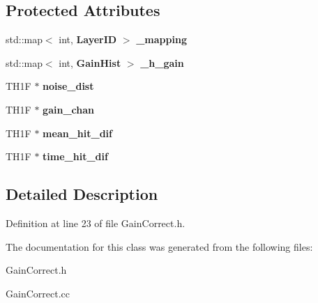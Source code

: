 \subsection*{Protected Attributes}
\begin{DoxyCompactItemize}
\item 
std\-::map$<$ int, {\bf Layer\-I\-D} $>$ {\bfseries \-\_\-mapping}\label{classGainCorrect_aff3835d1b24e6a6a7bfaa4d10158e13d}

\item 
std\-::map$<$ int, {\bf Gain\-Hist} $>$ {\bfseries \-\_\-h\-\_\-gain}\label{classGainCorrect_a67c3261e2ee9c65aa617661ef634052c}

\item 
T\-H1\-F $\ast$ {\bfseries noise\-\_\-dist}\label{classGainCorrect_a923de2eb0f07ab046e8c0205ac1ff968}

\item 
T\-H1\-F $\ast$ {\bfseries gain\-\_\-chan}\label{classGainCorrect_a38da4f5cc568c29f328cc09a1d780b7f}

\item 
T\-H1\-F $\ast$ {\bfseries mean\-\_\-hit\-\_\-dif}\label{classGainCorrect_aae8b02a5da778ef4fb29ad4b1d672d6a}

\item 
T\-H1\-F $\ast$ {\bfseries time\-\_\-hit\-\_\-dif}\label{classGainCorrect_ac468b93238fcf95b7d5d32c5a6724875}

\end{DoxyCompactItemize}


\subsection{Detailed Description}


Definition at line 23 of file Gain\-Correct.\-h.



The documentation for this class was generated from the following files\-:\begin{DoxyCompactItemize}
\item 
Gain\-Correct.\-h\item 
Gain\-Correct.\-cc\end{DoxyCompactItemize}
